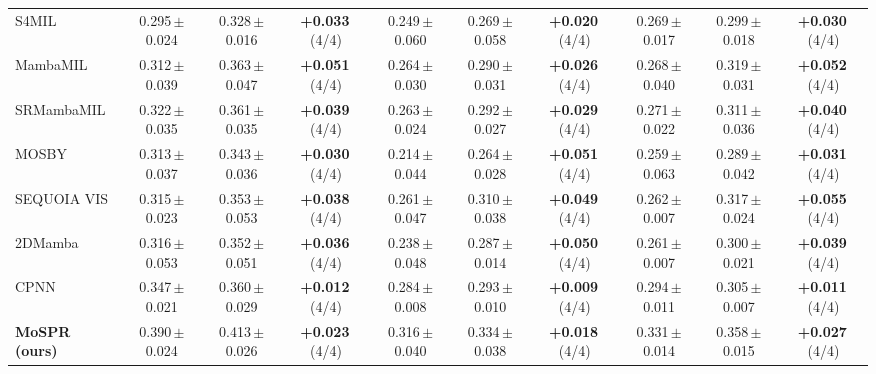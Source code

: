 \begin{tabular}{lccccccccc}
S4MIL & 0.295\,{\tiny$\pm$0.024} & 0.328\,{\tiny$\pm$0.016} & \textbf{+0.033}\,{\tiny(4/4)} & 0.249\,{\tiny$\pm$0.060} & 0.269\,{\tiny$\pm$0.058} & \textbf{+0.020}\,{\tiny(4/4)} & 0.269\,{\tiny$\pm$0.017} & 0.299\,{\tiny$\pm$0.018} & \textbf{+0.030}\,{\tiny(4/4)}\\
MambaMIL & 0.312\,{\tiny$\pm$0.039} & 0.363\,{\tiny$\pm$0.047} & \textbf{+0.051}\,{\tiny(4/4)} & 0.264\,{\tiny$\pm$0.030} & 0.290\,{\tiny$\pm$0.031} & \textbf{+0.026}\,{\tiny(4/4)} & 0.268\,{\tiny$\pm$0.040} & 0.319\,{\tiny$\pm$0.031} & \textbf{+0.052}\,{\tiny(4/4)}\\
SRMambaMIL & 0.322\,{\tiny$\pm$0.035} & 0.361\,{\tiny$\pm$0.035} & \textbf{+0.039}\,{\tiny(4/4)} & 0.263\,{\tiny$\pm$0.024} & 0.292\,{\tiny$\pm$0.027} & \textbf{+0.029}\,{\tiny(4/4)} & 0.271\,{\tiny$\pm$0.022} & 0.311\,{\tiny$\pm$0.036} & \textbf{+0.040}\,{\tiny(4/4)}\\
MOSBY & 0.313\,{\tiny$\pm$0.037} & 0.343\,{\tiny$\pm$0.036} & \textbf{+0.030}\,{\tiny(4/4)} & 0.214\,{\tiny$\pm$0.044} & 0.264\,{\tiny$\pm$0.028} & \textbf{+0.051}\,{\tiny(4/4)} & 0.259\,{\tiny$\pm$0.063} & 0.289\,{\tiny$\pm$0.042} & \textbf{+0.031}\,{\tiny(4/4)}\\
SEQUOIA VIS & 0.315\,{\tiny$\pm$0.023} & 0.353\,{\tiny$\pm$0.053} & \textbf{+0.038}\,{\tiny(4/4)} & 0.261\,{\tiny$\pm$0.047} & 0.310\,{\tiny$\pm$0.038} & \textbf{+0.049}\,{\tiny(4/4)} & 0.262\,{\tiny$\pm$0.007} & 0.317\,{\tiny$\pm$0.024} & \textbf{+0.055}\,{\tiny(4/4)}\\
2DMamba & 0.316\,{\tiny$\pm$0.053} & 0.352\,{\tiny$\pm$0.051} & \textbf{+0.036}\,{\tiny(4/4)} & 0.238\,{\tiny$\pm$0.048} & 0.287\,{\tiny$\pm$0.014} & \textbf{+0.050}\,{\tiny(4/4)} & 0.261\,{\tiny$\pm$0.007} & 0.300\,{\tiny$\pm$0.021} & \textbf{+0.039}\,{\tiny(4/4)}\\
CPNN & 0.347\,{\tiny$\pm$0.021} & 0.360\,{\tiny$\pm$0.029} & \textbf{+0.012}\,{\tiny(4/4)} & 0.284\,{\tiny$\pm$0.008} & 0.293\,{\tiny$\pm$0.010} & \textbf{+0.009}\,{\tiny(4/4)} & 0.294\,{\tiny$\pm$0.011} & 0.305\,{\tiny$\pm$0.007} & \textbf{+0.011}\,{\tiny(4/4)}\\
\textbf{MoSPR (ours)} & 0.390\,{\tiny$\pm$0.024} & 0.413\,{\tiny$\pm$0.026} & \textbf{+0.023}\,{\tiny(4/4)} & 0.316\,{\tiny$\pm$0.040} & 0.334\,{\tiny$\pm$0.038} & \textbf{+0.018}\,{\tiny(4/4)} & 0.331\,{\tiny$\pm$0.014} & 0.358\,{\tiny$\pm$0.015} & \textbf{+0.027}\,{\tiny(4/4)}\\
\bottomrule
\end{tabular}

